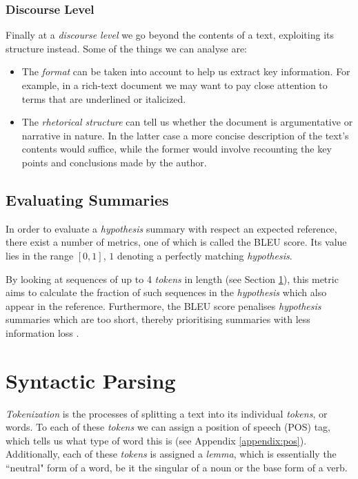 \subsubsection*{Discourse Level}

Finally at a \textit{discourse level} we go beyond the contents of a text, exploiting its structure instead. Some of the things we can analyse are:

\begin{itemize}
\item The \textit{format} can be taken into account to help us extract key information. For example, in a rich-text document we may want to pay close attention to terms that are underlined or italicized.
\item The \textit{rhetorical structure} can tell us whether the document is argumentative or narrative in nature. In the latter case a more concise description of the text's contents would suffice, while the former would involve recounting the key points and conclusions made by the author.
\end{itemize}

\subsection{Evaluating Summaries}

In order to evaluate a \textit{hypothesis} summary with respect an expected reference, there exist a number of metrics, one of which is called the BLEU score. Its value lies in the range $[0,1]$, $1$ denoting a perfectly matching \textit{hypothesis}.

By looking at sequences of up to 4 \textit{tokens} in length (see Section \ref{sec:syntactic_parsing}), this metric aims to calculate the fraction of such sequences in the \textit{hypothesis} which also appear in the reference. Furthermore, the BLEU score penalises \textit{hypothesis} summaries which are too short, thereby prioritising summaries with less information loss \cite{ehling_minimum_2007}.

\section{Syntactic Parsing}
\label{sec:syntactic_parsing}

\textit{Tokenization} is the processes of splitting a text into its individual \textit{tokens}, or words. To each of these \textit{tokens} we can assign a position of speech (POS) tag, which tells us what type of word this is (see Appendix \ref{appendix:pos}). Additionally, each of these \textit{tokens} is assigned a \textit{lemma}, which is essentially the ``neutral" form of a word, be it the singular of a noun or the base form of a verb.

